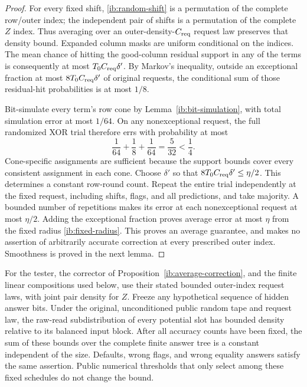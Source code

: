 \begin{proof}
For every fixed shift, \eqref{ib:random-shift} is a permutation
of the complete row/outer index; the independent pair of shifts
is a permutation of the complete \(Z\) index.  Thus averaging
over an outer-density-\(C_{\rm req}\) request law preserves that
density bound.  Expanded column masks are uniform conditional on
the indices.  The mean chance of hitting the good-column residual
support in any of the terms is consequently at most
\(T_0C_{\rm req}\delta'\).  By Markov's inequality, outside an
exceptional fraction at most \(8T_0C_{\rm req}\delta'\) of
original requests, the conditional sum of those residual-hit
probabilities is at most \(1/8\).

Bit-simulate every term's row cone by
Lemma~\ref{ib:bit-simulation}, with total simulation error at most
\(1/64\).  On any nonexceptional request, the full randomized
XOR trial therefore errs with probability at most
\[
 \frac1{64}+\frac18+\frac1{64}=\frac5{32}<\frac14.
\]
Cone-specific assignments are sufficient because the support bounds
cover every consistent assignment in each cone.  Choose
\(\delta'\) so that \(8T_0C_{\rm req}\delta'\le\eta/2\).
This determines a constant row-round count.  Repeat the entire
trial independently at the fixed request, including shifts, flags,
and all predictions, and take majority.  A bounded number of
repetitions makes its error at each nonexceptional request at most
\(\eta/2\).  Adding the exceptional fraction proves average error
at most \(\eta\) from the fixed radius \eqref{ib:fixed-radius}.
This proves an average guarantee, and makes no assertion of
arbitrarily accurate correction at every prescribed outer index.
Smoothness is proved in the next lemma.
\end{proof}

\begin{lemma}
\label{ib:all-branch-density}
For the tester, the corrector of
Proposition~\ref{ib:average-correction}, and the finite linear
compositions used below, use their stated bounded outer-index request
laws, with joint pair density for \(Z\). Freeze any hypothetical sequence
of hidden answer bits.  Under the original, unconditioned public random tape
and request law, the raw-read subdistribution of every potential
slot has bounded density relative to its balanced input block.
After all accuracy counts have been fixed, the sum of these bounds
over the complete finite answer tree is a constant independent of
the size.  Defaults, wrong flags, and wrong equality answers satisfy
the same assertion.  Public numerical thresholds that only select
among these fixed schedules do not change the bound.
\end{lemma}

